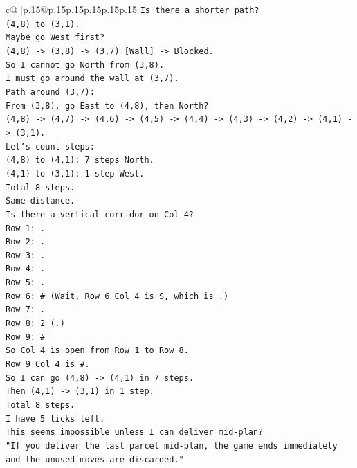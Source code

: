 \documentclass{article}
\begin{document}
{\begin{supertabular}{c@{$\;$}|p{.15\linewidth}@{}p{.15\linewidth}p{.15\linewidth}p{.15\linewidth}p{.15\linewidth}p{.15\linewidth}}
{{{\texttt{Is there a shorter path?} \\
\texttt{(4,8) to (3,1).} \\
\texttt{Maybe go West first?} \\
\texttt{(4,8) {-}> (3,8) {-}> (3,7) {[}Wall{]} {-}> Blocked.} \\
\texttt{So I cannot go North from (3,8).} \\
\texttt{I must go around the wall at (3,7).} \\
\texttt{Path around (3,7):} \\
\texttt{From (3,8), go East to (4,8), then North?} \\
\texttt{(4,8) {-}> (4,7) {-}> (4,6) {-}> (4,5) {-}> (4,4) {-}> (4,3) {-}> (4,2) {-}> (4,1) {-}> (3,1).} \\
\texttt{Let's count steps:} \\
\texttt{(4,8) to (4,1): 7 steps North.} \\
\texttt{(4,1) to (3,1): 1 step West.} \\
\texttt{Total 8 steps.} \\
\texttt{Same distance.} \\
\texttt{Is there a vertical corridor on Col 4?} \\
\texttt{Row 1: .} \\
\texttt{Row 2: .} \\
\texttt{Row 3: .} \\
\texttt{Row 4: .} \\
\texttt{Row 5: .} \\
\texttt{Row 6: \# (Wait, Row 6 Col 4 is S, which is .)} \\
\texttt{Row 7: .} \\
\texttt{Row 8: 2 (.)} \\
\texttt{Row 9: \#} \\
\texttt{So Col 4 is open from Row 1 to Row 8.} \\
\texttt{Row 9 Col 4 is \#.} \\
\texttt{So I can go (4,8) {-}> (4,1) in 7 steps.} \\
\texttt{Then (4,1) {-}> (3,1) in 1 step.} \\
\texttt{Total 8 steps.} \\
\texttt{I have 5 ticks left.} \\
\texttt{This seems impossible unless I can deliver mid{-}plan?} \\
\texttt{"If you deliver the last parcel mid{-}plan, the game ends immediately and the unused moves are discarded."} \\
}}}
\end{supertabular}}
\end{document}
